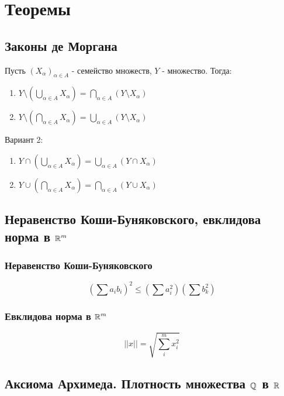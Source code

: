 \section{Теоремы}

\subsection{Законы де Моргана}

Пусть $(X_\alpha)_{\alpha \in A}$ - семейство множеств, $Y$ - множество. Тогда:

\begin{enumerate}
    \item $Y\setminus(\bigcup\limits_{\alpha \in A}X_\alpha) = \bigcap\limits_{\alpha \in A}(Y\setminus X_\alpha)$
    \item $Y\setminus(\bigcap\limits_{\alpha \in A}X_\alpha) = \bigcup\limits_{\alpha \in A}(Y\setminus X_\alpha)$
\end{enumerate}

Вариант 2:

\begin{enumerate}
    \item $Y\cap(\bigcup\limits_{\alpha \in A}X_\alpha) = \bigcup\limits_{\alpha \in A}(Y\cap X_\alpha)$
    \item $Y\cup(\bigcap\limits_{\alpha \in A}X_\alpha) = \bigcap\limits_{\alpha \in A}(Y\cup X_\alpha)$
\end{enumerate}

\subsection{Неравенство Коши-Буняковского, евклидова норма в $\operatorname*{\mathbb{R}}^m$}

\subsubsection{Неравенство Коши-Буняковского}

$$(\sum a_ib_i)^2 \leq (\sum a_i^2)(\sum b_k^2)$$

\subsubsection{Евклидова норма в $\operatorname*{\mathbb{R}}^m$}

$$||x||=\sqrt{\sum\limits_{i}^m x_i^2}$$

\subsection{Аксиома Архимеда. Плотность множества $\operatorname*{\mathbb{Q}}$ в $\operatorname*{\mathbb{R}}$}

